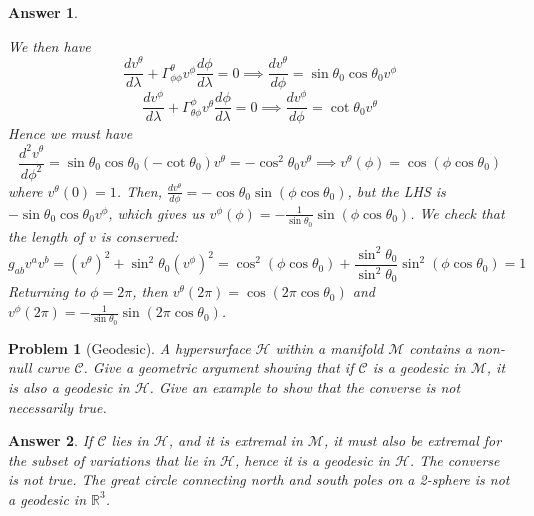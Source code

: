 \documentclass[a4paper]{article}
\newtheorem{ans}{Answer}[subsection]
\theoremstyle{new}
\newtheorem{qns}{Problem}[section]
\begin{document}
\begin{ans}
\begin{enumerate}[label=(\alph*)]
We then have
$$\frac{dv^\theta}{d\lambda}+\Gamma_{\phi\phi}^\theta v^\phi\frac{d\phi}{d\lambda}=0\implies\frac{dv^\theta}{d\phi}=\sin\theta_0\cos\theta_0 v^\phi$$
$$\frac{dv^\phi}{d\lambda}+\Gamma_{\theta\phi}^\phi v^\theta\frac{d\phi}{d\lambda}=0\implies\frac{dv^\phi}{d\phi}=\cot\theta_0 v^\theta$$
Hence we must have
$$\frac{d^2v^\theta}{d\phi^2}=\sin\theta_0\cos\theta_0(-\cot\theta_0)v^\theta=-\cos^2\theta_0v^\theta\implies v^\theta(\phi)=\cos(\phi\cos\theta_0)$$
where $v^\theta(0)=1$. Then, $\frac{dv^\theta}{d\phi}=-\cos\theta_0\sin(\phi\cos\theta_0)$, but the LHS is $-\sin\theta_0\cos\theta_0v^\phi$, which gives us $v^\phi(\phi)=-\frac{1}{\sin\theta_0}\sin(\phi\cos\theta_0)$. We check that the length of $v$ is conserved:
$$g_{ab}v^av^b=(v^\theta)^2+\sin^2\theta_0(v^\phi)^2=\cos^2(\phi\cos\theta_0)+\frac{\sin^2\theta_0}{\sin^2\theta_0}\sin^2(\phi\cos\theta_0)=1$$
Returning to $\phi=2\pi$, then $v^\theta(2\pi)=\cos(2\pi\cos\theta_0)$ and $v^\phi(2\pi)=-\frac{1}{\sin\theta_0}\sin(2\pi\cos\theta_0)$.
\end{enumerate}
\end{ans}
\begin{qns}[Geodesic]
A hypersurface $\mathcal{H}$ within a manifold $\mathcal{M}$ contains a non-null curve $\mathcal{C}$. Give a geometric argument showing that if $\mathcal{C}$ is a geodesic in $\mathcal{M}$, it is also a geodesic in $\mathcal{H}$. Give an example to show that the converse is not necessarily true.
\end{qns}
\begin{ans}
If $\mathcal{C}$ lies in $\mathcal{H}$, and it is extremal in $\mathcal{M}$, it must also be extremal for the subset of variations that lie in $\mathcal{H}$, hence it is a geodesic in $\mathcal{H}$. The converse is not true. The great circle connecting north and south poles on a 2-sphere is not a geodesic in $\mathbb{R}^3$.
\end{ans}
\end{document}
